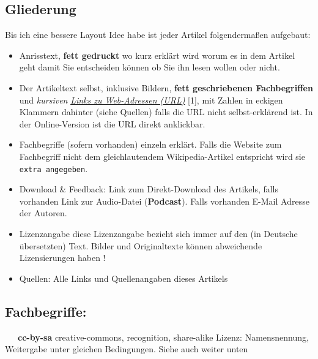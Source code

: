 \documentclass[10pt,a4paper,ngerman,twoside]{article} %
\begin{document}


\subsection*{Gliederung}
Bis ich eine bessere Layout Idee habe ist jeder Artikel folgendermaßen aufgebaut:
\begin{itemize}
\item Anrisstext, \textbf{fett gedruckt} wo kurz erklärt wird worum es in dem Artikel geht damit Sie entscheiden können ob Sie ihn lesen wollen oder nicht.
\item Der Artikeltext selbst, inklusive Bildern, \textbf{fett geschriebenen Fachbegriffen} und \textit{kursiven} \href{http://spielend-programmieren.at}{\textit{Links zu Web-Adressen (URL)}} [1], mit Zahlen in eckigen Klammern dahinter (siehe Quellen) falls die URL nicht selbst-erklärend ist. In der Online-Version ist die URL direkt anklickbar.
\item Fachbegriffe (sofern vorhanden) einzeln erklärt. Falls die Website zum Fachbegriff nicht dem gleichlautendem Wikipedia-Artikel entspricht wird sie \texttt{extra angegeben}.
\item Download \& Feedback: Link zum Direkt-Download des Artikels, falls vorhanden Link zur Audio-Datei (\textbf{Podcast}). Falls vorhanden E-Mail Adresse der Autoren.
\item Lizenzangabe diese Lizenzangabe bezieht sich immer auf den (in Deutsche übersetzten) Text. Bilder und Originaltexte können abweichende Lizensierungen haben ! 
\item Quellen: Alle Links und Quellenangaben dieses Artikels
\end{itemize}

\subsection*{Fachbegriffe:}

~~~\textbf{cc-by-sa} creative-commons, recognition, share-alike Lizenz:  Namensnennung, Weitergabe unter gleichen Bedingungen. Siehe auch weiter unten \\
\end{document}

